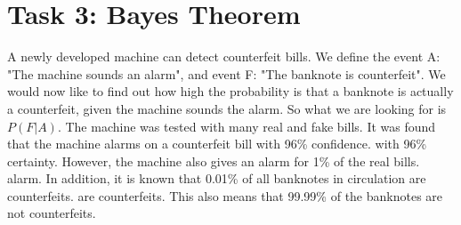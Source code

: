 \documentclass{article}
\begin{document}
\section*{Task 3: Bayes Theorem}
A newly developed machine can detect counterfeit bills. We define the event
A: "The machine sounds an alarm", and event F: "The banknote is counterfeit". We would now like to
find out how high the probability is that a banknote is actually a counterfeit,
given the machine sounds the alarm. So what we are looking for is $P(F|A)$. The machine was tested with many
real and fake bills. It was found that the machine alarms on a counterfeit bill with 96\% confidence.
with 96\% certainty. However, the machine also gives an alarm for 1\% of the real bills.
alarm. In addition, it is known that 0.01\% of all banknotes in circulation are counterfeits.
are counterfeits. This also means that 99.99\% of the banknotes are not counterfeits.


%
%
\end{document}
